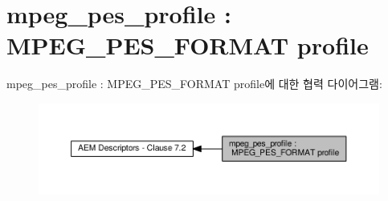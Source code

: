 \hypertarget{group__mpeg__pes__profile}{}\section{mpeg\+\_\+pes\+\_\+profile \+: M\+P\+E\+G\+\_\+\+P\+E\+S\+\_\+\+F\+O\+R\+M\+AT profile}
\label{group__mpeg__pes__profile}
mpeg\+\_\+pes\+\_\+profile \+: M\+P\+E\+G\+\_\+\+P\+E\+S\+\_\+\+F\+O\+R\+M\+AT profile에 대한 협력 다이어그램\+:
\nopagebreak
\begin{figure}[H]
\begin{center}
\leavevmode
\includegraphics[width=350pt]{group__mpeg__pes__profile}
\end{center}
\end{figure}
